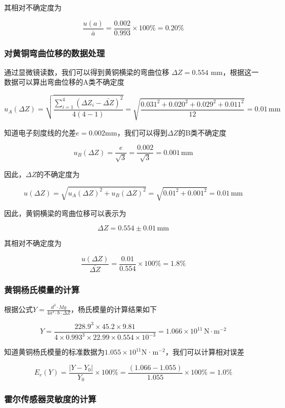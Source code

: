 \documentclass[zihao=5, UTF8]{article}
\theoremstyle{MyLineTheoremStyle} %
\theoremstyle{MyBlockTheoremStyle} %
\theoremstyle{MySubsubsectionStyle} %
\begin{document}
其相对不确定度为

\[ \frac{u(a)}{\bar{a}} = \frac{0.002}{0.993} \times 100 \% = 0.20 \% \]

\subsubsection{对黄铜弯曲位移的数据处理}

通过显微镜读数，我们可以得到黄铜横梁的弯曲位移 $\Delta Z = 0.554$ mm，根据这一数据可以算出弯曲位移的A类不确定度

\[ u_A(\Delta Z) = \sqrt{\frac{\sum_{i=1}^{4} (\Delta Z_i - \bar{\Delta Z})^2}{4(4-1)}} = \sqrt{\frac{0.031^2 + 0.020^2 + 0.029^2 + 0.011^2}{12}} = 0.01 \, \text{mm} \]

知道电子刻度线的允差$e = 0.002$mm，我们可以得到$\Delta Z$的B类不确定度

\[ u_B(\Delta Z) = \frac{e}{\sqrt{3}} = \frac{0.002}{\sqrt{3}} = 0.001 \, \text{mm} \]

因此，$\Delta Z$的不确定度为

\[ u(\Delta Z) = \sqrt{u_A(\Delta Z)^2 + u_B(\Delta Z)^2} = \sqrt{0.01^2 + 0.001^2} = 0.01 \, \text{mm} \]

因此，黄铜横梁的弯曲位移可以表示为

\[ \Delta Z = 0.554 \pm 0.01 \, \text{mm} \]

其相对不确定度为

\[ \frac{u(\Delta Z)}{\bar{\Delta Z}} = \frac{0.01}{0.554} \times 100 \% = 1.8 \% \]

\subsubsection{黄铜杨氏模量的计算}

根据公式$Y = \frac{d^3 \cdot Mg}{4a^3 \cdot b \cdot \Delta Z}$，杨氏模量的计算结果如下

\[Y = \frac{228.9^3 \times 45.2 \times 9.81}{4 \times 0.993^3 \times 22.99 \times 0.554 \times 10^{-3}} = 1.066 \times 10^{11} \, \text{N} \cdot \text{m}^{-2} \]

知道黄铜杨氏模量的标准数据为$1.055 \times 10^{11}$N·m$^{-2}$，我们可以计算相对误差

\[ E_r (Y) = \frac{|Y - Y_0|}{Y_0} \times 100\% = \frac{(1.066 - 1.055)}{1.055} \times 100\% = 1.0\% \]

\subsubsection{霍尔传感器灵敏度的计算}
\end{document}
